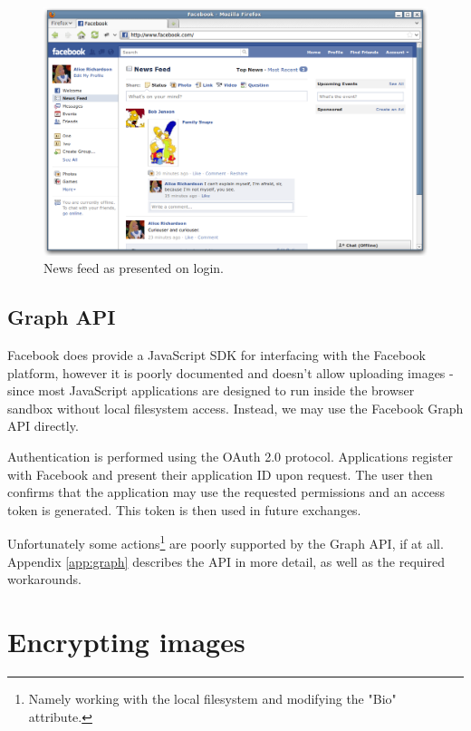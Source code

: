     \begin{figure}[tb]
        \begin{center}
                \includegraphics[width=12cm]{screens/facebook.png}
            \caption{News feed as presented on login.}
            \label{scn:fbook}
        \end{center}
    \end{figure}

\FloatBarrier
\subsection{Graph API}

Facebook does provide a JavaScript SDK for interfacing with the Facebook platform, however it is poorly documented and doesn't allow uploading images - since most JavaScript applications are designed to run inside the browser sandbox without local filesystem access. Instead, we may use the Facebook Graph API directly.

Authentication is performed using the OAuth 2.0 protocol. Applications register with Facebook and present their application ID upon request. The user then confirms that the application may use the requested permissions and an access token is generated. This token is then used in future exchanges.

Unfortunately some actions\footnote{Namely working with the local filesystem and modifying the "Bio" attribute.} are poorly supported by the Graph API, if at all. Appendix \ref{app:graph} describes the API in more detail, as well as the required workarounds.

    
\FloatBarrier
\section{Encrypting images}
\label{ssec:images}

